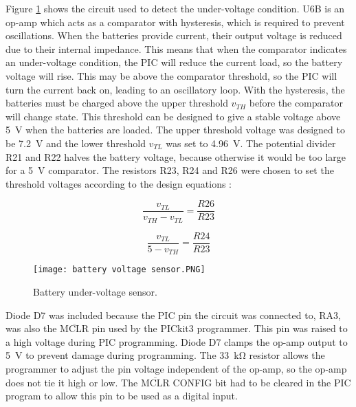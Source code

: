 Figure \ref{fig: battery voltage sensor} shows the circuit used to detect the under-voltage condition. U6B is an op-amp which acts as a comparator with hysteresis, which is required to prevent oscillations. When the batteries provide current, their output voltage is reduced due to their internal impedance. This means that when the comparator indicates an under-voltage condition, the PIC will reduce the current load, so the battery voltage will rise. This may be above the comparator threshold, so the PIC will turn the current back on, leading to an oscillatory loop. With the hysteresis, the batteries must be charged above the upper threshold $v_{TH}$ before the comparator will change state. This threshold can be designed to give a stable voltage above \SI{5}{\volt} when the batteries are loaded. The upper threshold voltage was designed to be \SI{7.2}{\volt} and the lower threshold $v_{TL}$ was set to \SI{4.96}{\volt}. The potential divider R21 and R22 halves the battery voltage, because otherwise it would be too large for a \SI{5}{\volt} comparator. The resistors R23, R24 and R26 were chosen to set the threshold voltages according to the design equations \cite{hysteresis}:
\begin{multicols}{2}
\begin{equation}
\frac{v_{TL}}{v_{TH} - v_{TL}} = \frac{R26}{R23}
\end{equation}

\begin{equation}
\frac{v_{TL}}{5 - v_{TH}} = \frac{R24}{R23}
\end{equation}
\end{multicols}

\begin{figure}[ht]
	\centering
	\texttt{[image: battery voltage sensor.PNG]}
	\caption{Battery under-voltage sensor.}
	\label{fig: battery voltage sensor}
\end{figure}

Diode D7 was included because the PIC pin the circuit was connected to, RA3, was also the $\overline{\text{MCLR}}$ pin used by the PICkit3 programmer. This pin was raised to a high voltage during PIC programming. Diode D7 clamps the op-amp output to \SI{5}{\volt} to prevent damage during programming. The \SI{33}{\kilo\ohm} resistor allows the programmer to adjust the pin voltage independent of the op-amp, so the op-amp does not tie it high or low. The $\overline{\text{MCLR}}$ CONFIG bit had to be cleared in the PIC program to allow this pin to be used as a digital input. \\

